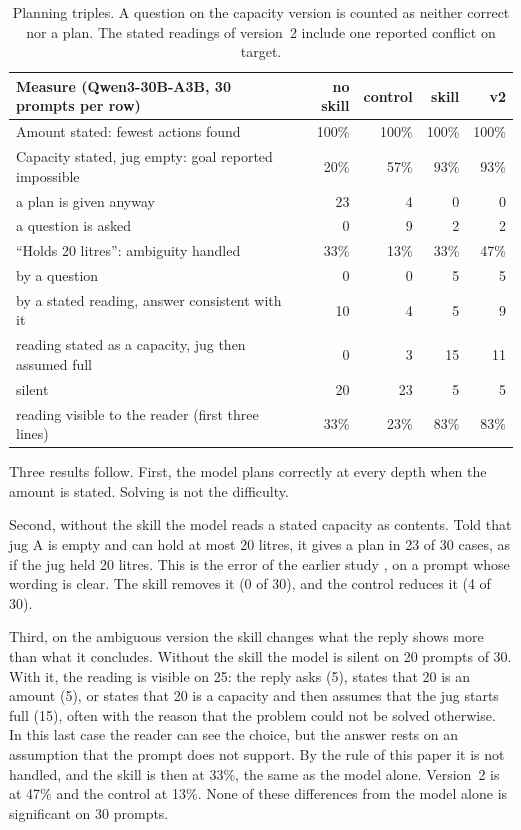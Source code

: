 \documentclass[11pt,a4paper]{article}
\begin{document}
\begin{table}[t]
\centering\small
\begin{tabular}{@{}L{7.4cm} rrrr@{}}
\toprule
Measure (Qwen3-30B-A3B, 30 prompts per row) & no skill & control & skill & v2 \\
\midrule
Amount stated: fewest actions found & 100\% & 100\% & 100\% & 100\% \\
Capacity stated, jug empty: goal reported impossible & 20\% & 57\% & 93\% & 93\% \\
\quad a plan is given anyway & 23 & 4 & 0 & 0 \\
\quad a question is asked & 0 & 9 & 2 & 2 \\
``Holds 20 litres'': ambiguity handled & 33\% & 13\% & 33\% & 47\% \\
\quad by a question & 0 & 0 & 5 & 5 \\
\quad by a stated reading, answer consistent with it & 10 & 4 & 5 & 9 \\
\quad reading stated as a capacity, jug then assumed full & 0 & 3 & 15 & 11 \\
\quad silent & 20 & 23 & 5 & 5 \\
\quad reading visible to the reader (first three lines) & 33\% & 23\% & 83\% & 83\% \\
\bottomrule
\end{tabular}
\caption{Planning triples. A question on the capacity version is counted
as neither correct nor a plan. The stated readings of version~2 include
one reported conflict on target.}
\label{tab:plan}
\end{table}

Three results follow. First, the model plans correctly at every depth when
the amount is stated. Solving is not the difficulty.

Second, without the skill the model reads a stated capacity as contents.
Told that jug A is empty and can hold at most 20 litres, it gives a plan
in 23 of 30 cases, as if the jug held 20 litres. This is the error of the
earlier study \cite{dubray2026grammarllm}, on a prompt whose wording is
clear. The skill removes it (0 of 30), and the control reduces it (4 of
30).

Third, on the ambiguous version the skill changes what the reply shows
more than what it concludes. Without the skill the model is silent on 20
prompts of 30. With it, the reading is visible on 25: the reply asks (5),
states that 20 is an amount (5), or states that 20 is a capacity and then
assumes that the jug starts full (15), often with the reason that the
problem could not be solved otherwise. In this last case the reader can
see the choice, but the answer rests on an assumption that the prompt
does not support. By the rule of this paper it is not handled, and the
skill is then at 33\%, the same as the model alone. Version~2 is at
47\% and the control at 13\%. None of these differences from the model
alone is significant on 30 prompts.
\end{document}
